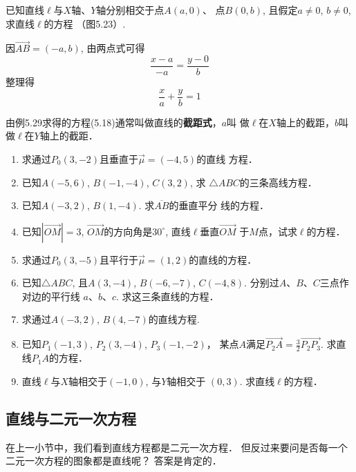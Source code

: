 \begin{example}
    已知直线$\ell$与$X$轴、$Y$轴分别相交于点$A(a,0)$、
点$B(0,b)$, 且假定$a\ne 0$, $b\ne 0$, 求直线$\ell$的方程
（图5.23）.
\end{example}

\begin{solution}
    因$\Vec{AB}=(-a,b)$, 由两点式可得
\[\frac{x-a}{-a}=\frac{y-0}{b}\]
整理得
\begin{equation}
    \frac{x}{a}+\frac{y}{b}=1
\end{equation}
\end{solution}

由例5.29求得的方程(5.18)通常叫做直线的\textbf{截距式}，$a$叫
做$\ell$在$X$轴上的截距，$b$叫做$\ell$在$Y$轴上的截距．

\begin{ex}
\begin{enumerate}
    \item 求通过$P_0(3,-2)$且垂直于$\vec{\mu}=(-4,5)$的直线
    方程．
    \item 已知$A(-5,6)$, $B(-1,-4)$, $C(3,2)$, 求
    $\triangle ABC$的三条高线方程．
    \item 已知$A(-3,2)$, $B(1,-4)$. 求$\overline{AB}$的垂直平分
    线的方程．
    \item 已知$|\Vec{OM}|=3$, $\Vec{OM}$的方向角是$30^{\circ}$, 直线$\ell$垂直$\Vec{OM}$
    于$M$点，试求$\ell$的方程．
    \item 求通过$P_0(3,-5)$且平行于$\vec{\mu}=(1,2)$的直线的方程．
    \item 已知$\triangle ABC$, 且$A(3,-4)$, $B(-6,-7)$, 
    $C(-4,8)$. 分别过$A$、$B$、$C$三点作对边的平行线
    $a$、$b$、$c$. 求这三条直线的方程．
    \item 求通过$A(-3,2)$, $B(4,-7)$的直线方程.
    \item 已知$P_1(-1,3)$, $P_2(3,-4)$, $P_3(-1,-2)$，
    某点$A$满足$\Vec{P_2A}=\frac{3}{2}\Vec{P_2P_3}$. 求直线$P_1A$的方程． 
    \item 直线$\ell$与$X$轴相交于$(-1,0)$, 与$Y$轴相交于
    $(0,3)$. 求直线$\ell$的方程．
\end{enumerate}
\end{ex}

\subsection{直线与二元一次方程}
在上一小节中，我们看到直线方程都是二元一次方程．
但反过来要问是否每一个二元一次方程的图象都是直线呢？
答案是肯定的．

